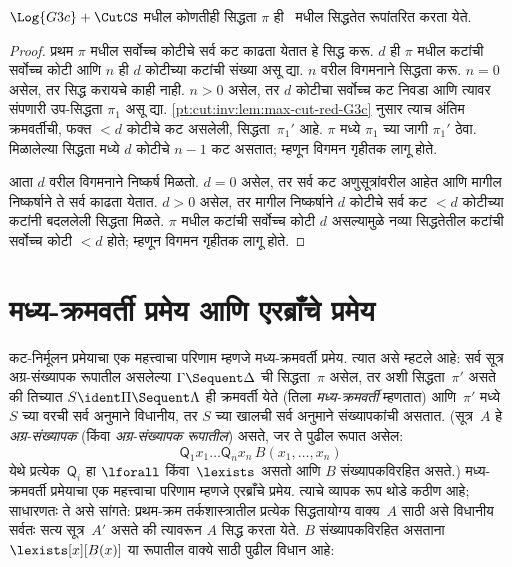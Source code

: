 \begin{thm}\label{pt:cut:inv:thm:cut-elim-G3c-largest}
$\Log{G3c} + \CutCS$ मधील कोणतीही
सिद्धता $\pi$ ही~ मधील
सिद्धतेत रूपांतरित करता येते.
\end{thm}

\begin{proof}
  प्रथम $\pi$ मधील सर्वोच्च कोटीचे
  सर्व कट काढता येतात हे सिद्ध करू.
  $d$ ही $\pi$ मधील कटांची सर्वोच्च
  कोटी आणि $n$ ही $d$ कोटीच्या कटांची
  संख्या असू द्या. $n$ वरील विगमनाने
  सिद्धता करू. $n=0$ असेल, तर
  सिद्ध करायचे काही नाही. $n>0$
  असेल, तर $d$ कोटीचा सर्वोच्च कट
  निवडा आणि त्यावर संपणारी उप-सिद्धता
  $\pi_1$ असू द्या.
  \ref{pt:cut:inv:lem:max-cut-red-G3c} नुसार
  त्याच अंतिम क्रमवर्तीची, फक्त
  $<d$ कोटीचे कट असलेली,
  सिद्धता~$\pi_1'$ आहे.
  $\pi$ मध्ये $\pi_1$ च्या जागी
  $\pi_1'$ ठेवा. मिळालेल्या
  सिद्धता मध्ये $d$ कोटीचे
  $n-1$ कट असतात; म्हणून
  विगमन गृहीतक लागू होते.

आता $d$ वरील विगमनाने निष्कर्ष
मिळतो. $d=0$ असेल, तर सर्व कट
अणुसूत्रांवरील आहेत आणि मागील
निष्कर्षाने ते सर्व काढता येतात.
$d>0$ असेल, तर मागील निष्कर्षाने
$d$ कोटीचे सर्व कट $<d$ कोटीच्या
कटांनी बदललेली सिद्धता मिळते.
$\pi$ मधील कटांची सर्वोच्च कोटी
$d$ असल्यामुळे नव्या सिद्धतेतील
कटांची सर्वोच्च कोटी $<d$ होते;
म्हणून विगमन गृहीतक लागू होते.
\end{proof}













\section{मध्य-क्रमवर्ती प्रमेय आणि एरब्राँचे प्रमेय}\label{pt:cut:mid:sec}

कट-निर्मूलन प्रमेयाचा एक महत्त्वाचा
परिणाम म्हणजे मध्य-क्रमवर्ती प्रमेय.
त्यात असे म्हटले आहे: सर्व सूत्र
अग्र-संख्यापक रूपातील असलेल्या
$\Gamma \Sequent \Delta$ ची
सिद्धता~$\pi$ असेल, तर अशी
सिद्धता~$\pi'$ असते की तिच्यात
$S \ident \Pi \Sequent
\Lambda$ ही क्रमवर्ती येते
(तिला \emph{मध्य-क्रमवर्ती} म्हणतात)
आणि~$\pi'$ मध्ये $S$ च्या
वरची सर्व अनुमाने विधानीय,
तर $S$ च्या खालची सर्व अनुमाने
संख्यापकांची असतात.
(सूत्र~$A$ हे
\emph{अग्र-संख्यापक} (किंवा
\emph{अग्र-संख्यापक रूपातील}) असते,
जर ते पुढील रूपात असेल:
\[\mathsf{Q}_1x_1\dots\mathsf{Q}_nx_n\,B(x_1,\dots,x_n)\]
येथे प्रत्येक~$\mathsf{Q}_i$
हा $\lforall$ किंवा~$\lexists$
असतो आणि $B$ संख्यापकविरहित असते.) मध्य-क्रमवर्ती प्रमेयाचा
एक महत्त्वाचा परिणाम म्हणजे
एरब्राँचे प्रमेय. त्याचे व्यापक
रूप थोडे कठीण आहे; साधारणतः
ते असे सांगते: प्रथम-क्रम
तर्कशास्त्रातील प्रत्येक
सिद्धतायोग्य वाक्य~$A$
साठी असे विधानीय
सर्वतः सत्य सूत्र~$A'$
असते की त्यावरून $A$
सिद्ध करता येते.
$B$ संख्यापकविरहित
असताना $\lexists[x][B(x)]$
या रूपातील वाक्ये साठी
पुढील विधान आहे:

